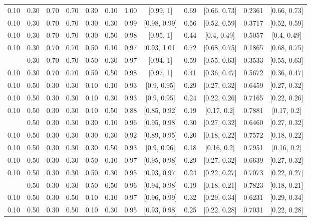 \documentclass[
  11pt,
]{article}
\begin{document}
\begin{landscape}
\begin{ThreePartTable}
\begin{longtable}[t]{cccccccccccc}
0.10 & 0.30 & 0.70 & 0.70 & 0.30 & 0.10 & 1.00 & {}[0.99, 1] & 0.69 & {}[0.66, 0.73] & 0.2361 & {}[0.66, 0.73]\\
0.10 & 0.30 & 0.70 & 0.70 & 0.30 & 0.30 & 0.99 & {}[0.98, 0.99] & 0.56 & {}[0.52, 0.59] & 0.3717 & {}[0.52, 0.59]\\
0.10 & 0.30 & 0.70 & 0.70 & 0.30 & 0.50 & 0.98 & {}[0.95, 1] & 0.44 & {}[0.4, 0.49] & 0.5057 & {}[0.4, 0.49]\\
0.10 & 0.30 & 0.70 & 0.70 & 0.50 & 0.10 & 0.97 & {}[0.93, 1.01] & 0.72 & {}[0.68, 0.75] & 0.1865 & {}[0.68, 0.75]\\
\addlinespace
0.10 & 0.30 & 0.70 & 0.70 & 0.50 & 0.30 & 0.97 & {}[0.94, 1] & 0.59 & {}[0.55, 0.63] & 0.3533 & {}[0.55, 0.63]\\
0.10 & 0.30 & 0.70 & 0.70 & 0.50 & 0.50 & 0.98 & {}[0.97, 1] & 0.41 & {}[0.36, 0.47] & 0.5672 & {}[0.36, 0.47]\\
0.10 & 0.50 & 0.30 & 0.30 & 0.10 & 0.10 & 0.93 & {}[0.9, 0.95] & 0.29 & {}[0.27, 0.32] & 0.6459 & {}[0.27, 0.32]\\
0.10 & 0.50 & 0.30 & 0.30 & 0.10 & 0.30 & 0.93 & {}[0.9, 0.95] & 0.24 & {}[0.22, 0.26] & 0.7165 & {}[0.22, 0.26]\\
0.10 & 0.50 & 0.30 & 0.30 & 0.10 & 0.50 & 0.88 & {}[0.85, 0.92] & 0.19 & {}[0.17, 0.2] & 0.7881 & {}[0.17, 0.2]\\
\addlinespace
0.10 & 0.50 & 0.30 & 0.30 & 0.30 & 0.10 & 0.96 & {}[0.95, 0.98] & 0.30 & {}[0.27, 0.32] & 0.6460 & {}[0.27, 0.32]\\
0.10 & 0.50 & 0.30 & 0.30 & 0.30 & 0.30 & 0.92 & {}[0.89, 0.95] & 0.20 & {}[0.18, 0.22] & 0.7572 & {}[0.18, 0.22]\\
0.10 & 0.50 & 0.30 & 0.30 & 0.30 & 0.50 & 0.93 & {}[0.9, 0.96] & 0.18 & {}[0.16, 0.2] & 0.7951 & {}[0.16, 0.2]\\
0.10 & 0.50 & 0.30 & 0.30 & 0.50 & 0.10 & 0.97 & {}[0.95, 0.98] & 0.29 & {}[0.27, 0.32] & 0.6639 & {}[0.27, 0.32]\\
0.10 & 0.50 & 0.30 & 0.30 & 0.50 & 0.30 & 0.95 & {}[0.93, 0.97] & 0.24 & {}[0.22, 0.27] & 0.7073 & {}[0.22, 0.27]\\
\addlinespace
0.10 & 0.50 & 0.30 & 0.30 & 0.50 & 0.50 & 0.96 & {}[0.94, 0.98] & 0.19 & {}[0.18, 0.21] & 0.7823 & {}[0.18, 0.21]\\
0.10 & 0.50 & 0.30 & 0.50 & 0.10 & 0.10 & 0.97 & {}[0.96, 0.99] & 0.32 & {}[0.29, 0.34] & 0.6231 & {}[0.29, 0.34]\\
0.10 & 0.50 & 0.30 & 0.50 & 0.10 & 0.30 & 0.95 & {}[0.93, 0.98] & 0.25 & {}[0.22, 0.28] & 0.7031 & {}[0.22, 0.28]\\

\end{longtable}
\end{ThreePartTable}
\end{landscape}
\end{document}
